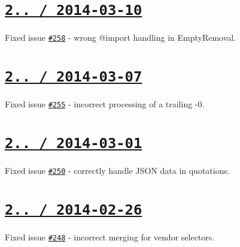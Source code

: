 \section*{\href{https://github.com/jakubpawlowicz/clean-css/compare/v2.1.5...v2.1.6}{\tt 2.. / 2014-\/03-\/10} }


\begin{DoxyItemize}
\item Fixed issue \href{https://github.com/jakubpawlowicz/clean-css/issues/258}{\tt \#258} -\/ wrong {\ttfamily @import} handling in {\ttfamily Empty\+Removal}.
\end{DoxyItemize}

\section*{\href{https://github.com/jakubpawlowicz/clean-css/compare/v2.1.4...v2.1.5}{\tt 2.. / 2014-\/03-\/07} }


\begin{DoxyItemize}
\item Fixed issue \href{https://github.com/jakubpawlowicz/clean-css/issues/255}{\tt \#255} -\/ incorrect processing of a trailing {\ttfamily -\/0}.
\end{DoxyItemize}

\section*{\href{https://github.com/jakubpawlowicz/clean-css/compare/v2.1.3...v2.1.4}{\tt 2.. / 2014-\/03-\/01} }


\begin{DoxyItemize}
\item Fixed issue \href{https://github.com/jakubpawlowicz/clean-css/issues/250}{\tt \#250} -\/ correctly handle J\+S\+ON data in quotations.
\end{DoxyItemize}

\section*{\href{https://github.com/jakubpawlowicz/clean-css/compare/v2.1.2...v2.1.3}{\tt 2.. / 2014-\/02-\/26} }


\begin{DoxyItemize}
\item Fixed issue \href{https://github.com/jakubpawlowicz/clean-css/issues/248}{\tt \#248} -\/ incorrect merging for vendor selectors.
\end{DoxyItemize}


